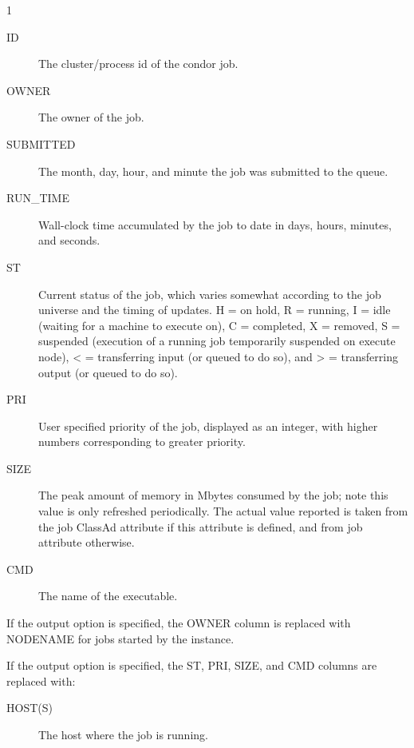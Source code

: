 \begin{ManPage}{\label{man-condor-q}}{1}
\begin{description}
\item[ID] The cluster/process id of the condor job. 
\item[OWNER] The owner of the job. 
\item[SUBMITTED] The month, day, hour, and minute the job was submitted to the 
	queue. 
\item[RUN\_TIME]  Wall-clock time accumulated by the job to date in days, 
	hours, minutes, and seconds.  
\item[ST] Current status of the job, which varies somewhat according
        to the job universe and the timing of updates.
        H = on hold,
        R = running,
	I = idle
        (waiting for a machine to execute on), C = completed, 
        X = removed,
		S = suspended (execution of a running job temporarily suspended on execute node),
        < = transferring input (or queued to do so), and
        > = transferring output (or queued to do so). 
\item[PRI] User specified priority of the job, displayed as an integer, with 
	higher numbers corresponding to greater priority. 
\item[SIZE] The peak amount of memory in Mbytes consumed by the job; note
	this value is only refreshed periodically.  The actual value reported is
	taken from the job ClassAd attribute  if this attribute
	is defined, and from job attribute  otherwise.
\item[CMD] The name of the executable. 
\end{description}

If the output option  is specified, the OWNER column is replaced
with NODENAME for jobs started by the  instance.

If the output option  is specified, the ST, PRI, SIZE, and CMD
columns are replaced with:

\begin{description}
\item[HOST(S)] The host where the job is running.
\end{description}


\end{ManPage}
